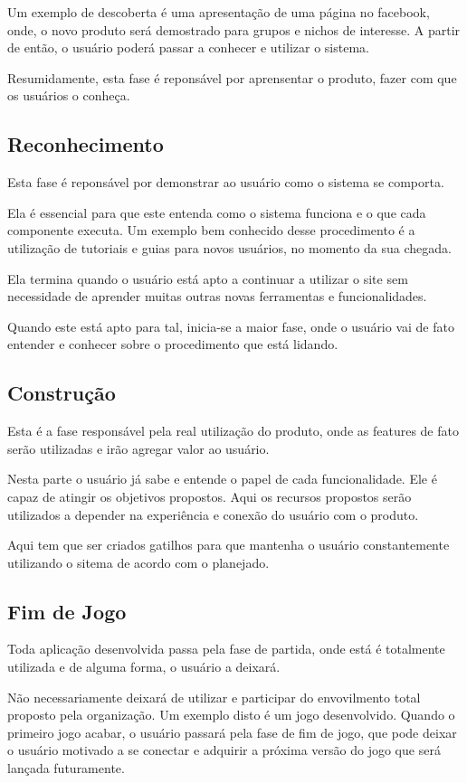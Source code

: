 Um exemplo de descoberta é uma apresentação de uma página no facebook, onde,
o novo produto será demostrado para grupos e nichos de interesse. A partir
de então, o usuário poderá passar a conhecer e utilizar o sistema.

Resumidamente, esta fase é reponsável por aprensentar o produto, fazer
com que os usuários o conheça.

\subsection{Reconhecimento}
\label{sub:reconhecimento}
Esta fase é reponsável por demonstrar ao usuário como o sistema se comporta.

Ela é essencial para que este entenda como o sistema funciona e o que cada
componente executa. Um exemplo bem conhecido desse procedimento é a utilização
de tutoriais e guias para novos usuários, no momento da sua chegada.

Ela termina quando o usuário está apto a continuar a utilizar o site sem
necessidade de aprender muitas outras novas ferramentas e funcionalidades.

Quando este está apto para tal, inicia-se a maior fase, onde o usuário
vai de fato entender e conhecer sobre o procedimento que está lidando.

\subsection{Construção}
\label{sub:constru_o}
Esta é a fase responsável pela real utilização do produto, onde as features
de fato serão utilizadas e irão agregar valor ao usuário.

Nesta parte o usuário já sabe e entende o papel de cada funcionalidade. Ele é capaz
de atingir os objetivos propostos. Aqui os recursos propostos serão utilizados
a depender na experiência e conexão do usuário com o produto.

Aqui tem que ser criados gatilhos para que mantenha o usuário constantemente utilizando
o sitema de acordo com o planejado.

\subsection{Fim de Jogo}
\label{sub:fim_de_jogo}
Toda aplicação desenvolvida passa pela fase de partida, onde está é totalmente utilizada
e de alguma forma, o usuário a deixará. 

Não necessariamente deixará de utilizar e participar do envovilmento total proposto pela
organização. Um exemplo disto é um jogo desenvolvido. Quando o primeiro jogo acabar, o
usuário passará pela fase de fim de jogo, que pode deixar o usuário motivado a se conectar
e adquirir a próxima versão do jogo que será lançada futuramente.

